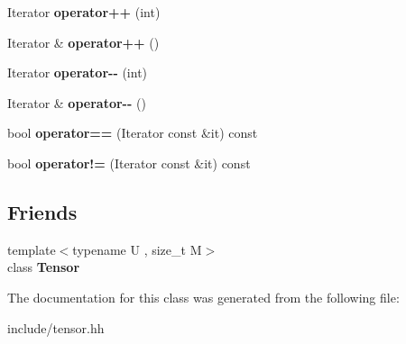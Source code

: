 \begin{DoxyCompactItemize}
\item 
Iterator {\bfseries operator++} (int)\hypertarget{classtensor_1_1Tensor_3_01T_00_010_01_4_1_1Iterator_ace0e13cc2b8f7a05ff4311987b421dd1}{}\label{classtensor_1_1Tensor_3_01T_00_010_01_4_1_1Iterator_ace0e13cc2b8f7a05ff4311987b421dd1}

\item 
Iterator \& {\bfseries operator++} ()\hypertarget{classtensor_1_1Tensor_3_01T_00_010_01_4_1_1Iterator_af7bc631b7d2bb2ba026830ed53615762}{}\label{classtensor_1_1Tensor_3_01T_00_010_01_4_1_1Iterator_af7bc631b7d2bb2ba026830ed53615762}

\item 
Iterator {\bfseries operator-\/-\/} (int)\hypertarget{classtensor_1_1Tensor_3_01T_00_010_01_4_1_1Iterator_a79eeee3208a58d9b525b1bb963917cbe}{}\label{classtensor_1_1Tensor_3_01T_00_010_01_4_1_1Iterator_a79eeee3208a58d9b525b1bb963917cbe}

\item 
Iterator \& {\bfseries operator-\/-\/} ()\hypertarget{classtensor_1_1Tensor_3_01T_00_010_01_4_1_1Iterator_a3ea007ef689a6d81d0b2b3d566077679}{}\label{classtensor_1_1Tensor_3_01T_00_010_01_4_1_1Iterator_a3ea007ef689a6d81d0b2b3d566077679}

\item 
bool {\bfseries operator==} (Iterator const \&it) const \hypertarget{classtensor_1_1Tensor_3_01T_00_010_01_4_1_1Iterator_a5dd1ad0bae5fed40fb85d1c19dc6b1b0}{}\label{classtensor_1_1Tensor_3_01T_00_010_01_4_1_1Iterator_a5dd1ad0bae5fed40fb85d1c19dc6b1b0}

\item 
bool {\bfseries operator!=} (Iterator const \&it) const \hypertarget{classtensor_1_1Tensor_3_01T_00_010_01_4_1_1Iterator_aebfe26bba80591fea31ed9e0e5f3cd14}{}\label{classtensor_1_1Tensor_3_01T_00_010_01_4_1_1Iterator_aebfe26bba80591fea31ed9e0e5f3cd14}

\end{DoxyCompactItemize}
\subsection*{Friends}
\begin{DoxyCompactItemize}
\item 
{\footnotesize template$<$typename U , size\+\_\+t M$>$ }\\class {\bfseries Tensor}\hypertarget{classtensor_1_1Tensor_3_01T_00_010_01_4_1_1Iterator_af4a07134de1525172d3c60c57e8f1496}{}\label{classtensor_1_1Tensor_3_01T_00_010_01_4_1_1Iterator_af4a07134de1525172d3c60c57e8f1496}

\end{DoxyCompactItemize}


The documentation for this class was generated from the following file\+:\begin{DoxyCompactItemize}
\item 
include/tensor.\+hh\end{DoxyCompactItemize}
